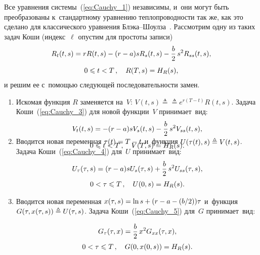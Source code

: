 \begin{multicols}{2}
Все уравнения сис\-те\-мы~(\ref{eq:Cauchy_1}) независимы, и~они могут быть преобразованы к~стандартному уравнению теп\-ло\-про\-вод\-ности так же, 
как это сделано для классического урав\-не\-ния Блэ\-ка--Шоул\-за~\cite{Sh_98}. Рас\-смот\-рим одну из таких задач Коши (индекс~$\ell$ опус\-тим для 
прос\-то\-ты за\-писи)
\begin{multline}
R_t(t,s) = rR(t,s) - (r - a)sR_s(t,s) - \displaystyle\frac{\displaystyle b\mathstrut}{\displaystyle 2\mathstrut}\,s^2R_{ss}(t,s), \\[2pt]
 0 \leqslant t < T\,,
\quad R(T,s) = H_R(s),
\label{eq:Cauchy_3}
\end{multline}
и решим ее с~по\-мощью сле\-ду\-ющей по\-сле\-до\-ва\-тель\-ности за\-мен.
\begin{enumerate}[1.]
\item
Искомая функция $R$ заменяется на~$V$:
$V(t,s) \triangleq$\linebreak $\triangleq e^{r(T-t)} R(t,s)$.
Задача Коши~(\ref{eq:Cauchy_3}) для новой функции~$V$ при\-ни\-ма\-ет~вид:
\begin{multline}
V_t(t,s) =  - (r - a)sV_s(t,s) - \displaystyle\frac{\displaystyle b\mathstrut}{\displaystyle 2\mathstrut} \,s^2V_{ss}(t,s), \\[2pt]
 0 \leqslant t < T\,,
\quad V(T,s) = H_R(s).\\[-30pt]
\label{eq:Cauchy_4}
\end{multline}
\end{enumerate}

\columnbreak

\begin{enumerate}[1.]
\setcounter{enumi}{1}
\item
Вводится новая переменная $\tau(t) \hm= T\hm-t$ и~функция $U(\tau(t),s)\hm \triangleq V(t,s)$. Задача Коши~(\ref{eq:Cauchy_4}) для~$U$ при\-ни\-ма\-ет~вид:
\begin{multline}
U_{\tau}(\tau,s) =  (r - a)sU_s(\tau,s) + \displaystyle\frac{\displaystyle b\mathstrut}{\displaystyle 2\mathstrut}\,s^2U_{ss}(\tau,s), \\
 0 < \tau \leqslant T\,,
\quad U(0,s) = H_R(s).
\label{eq:Cauchy_5}
\end{multline}
\item
Вводится новая переменная $x(\tau,s) \hm= \ln s\hm + (r-a-({b}/{2}))\tau$ и~функция $G(\tau,x(\tau,s)) \hm\triangleq U(\tau,s)$. 
Задача Коши~(\ref{eq:Cauchy_5}) для~$G$ при\-ни\-ма\-ет~вид:

\vspace*{-3pt}

\noindent
\begin{multline}
G_{\tau}(\tau,x) =  \displaystyle\frac{\displaystyle b\mathstrut}{\displaystyle 2\mathstrut}\,x^2G_{xx}(\tau,x), \\
 0 < \tau \leqslant T\,,
\quad G(0,x(0,s)) = H_R(s).
\label{eq:Cauchy_5-1}
\end{multline}


\end{enumerate}
\end{multicols}
